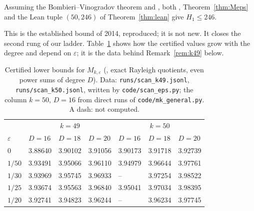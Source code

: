 \begin{corollary}\label{cor:246}
Assuming the Bombieri--Vinogradov theorem and \cite[Thm.~3.12(i)]{Pol14b},
both , Theorem~\ref{thm:Meps} and the Lean tuple $(50,246)$
of Theorem~\ref{thm:lean} give $H_1\le246$.
\end{corollary}

This is the established bound of 2014, reproduced; it is not new. It closes
the second rung of our ladder. Table~\ref{tab:eps} shows how the certified
values grow with the degree and depend on $\varepsilon$; it is the data
behind Remark~\ref{rem:k49} below.

\begin{table}[h]
\caption{Certified lower bounds for $M_{k,\varepsilon}$ (, exact
Rayleigh quotients, even power sums of degree $D$). Data:
\texttt{runs/scan\_k49.jsonl}, \texttt{runs/scan\_k50.jsonl}, written by
\texttt{code/scan\_eps.py}; the column $k=50$, $D=16$ from direct runs of
\texttt{code/mk\_general.py}. A dash: not computed.}
\label{tab:eps}
\begin{tabular}{@{}lllllll@{}}
\toprule
& \multicolumn{3}{c}{$k=49$} & \multicolumn{3}{c}{$k=50$}\\
$\varepsilon$ & $D=16$ & $D=18$ & $D=20$ & $D=16$ & $D=18$ & $D=20$\\
\midrule
$0$    & 3.88640 & 3.90102 & 3.91056 & 3.90173 & 3.91718 & 3.92739\\
$1/50$ & 3.93491 & 3.95066 & 3.96110 & 3.94979 & 3.96644 & 3.97761\\
$1/30$ & 3.93969 & 3.95745 & 3.96933 & --      & 3.97254 & 3.98522\\
$1/25$ & 3.93674 & 3.95563 & 3.96840 & 3.95041 & 3.97034 & 3.98395\\
$1/20$ & 3.92741 & 3.94823 & 3.96244 & --      & 3.96234 & 3.97745\\
\bottomrule
\end{tabular}
\end{table}

